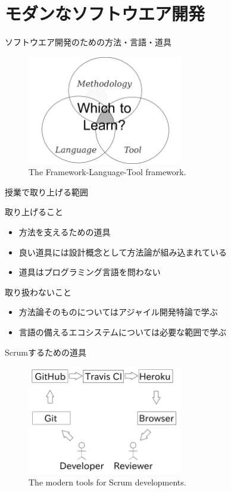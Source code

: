 \documentclass[12pt, t, aspectratio=169]{beamer}
\begin{document}
\section{モダンなソフトウエア開発}
\label{sec-1-4}
\begin{frame}[label=sec-1-4-1]{ソフトウエア開発のための方法・言語・道具}
\begin{figure}[htb]
\centering
\includegraphics[width=0.6\textwidth]{./figures/FLT_framework.pdf}
\caption{\label{FLT_framework}The Framework-Language-Tool framework.}
\end{figure}
\end{frame}
\begin{frame}[label=sec-1-4-2]{授業で取り上げる範囲}
\begin{block}{取り上げること}
\begin{itemize}
\item 方法を支えるための道具
\item 良い道具には設計概念として方法論が組み込まれている
\item 道具はプログラミング言語を問わない
\end{itemize}
\end{block}
\begin{block}{取り扱わないこと}
\begin{itemize}
\item 方法論そのものについてはアジャイル開発特論で学ぶ
\item 言語の備えるエコシステムについては必要な範囲で学ぶ
\end{itemize}
\end{block}
\end{frame}
\begin{frame}[label=sec-1-4-3]{Scrumするための道具}
\begin{figure}[htb]
\centering
\includegraphics[width=0.6\textwidth]{./figures/tools.pdf}
\caption{\label{tools}The modern tools for Scrum developments.}
\end{figure}
\end{frame}
\end{document}
